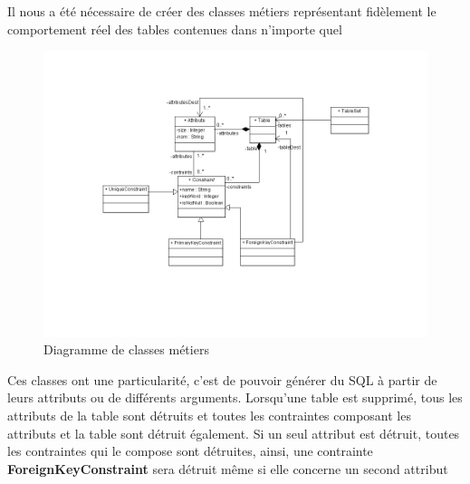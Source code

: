 Il nous a été nécessaire de créer des classes métiers représentant fidèlement le comportement réel des tables contenues dans n'importe quel \sgbd

\begin{figure}[!h]
\centering
\includegraphics[width=13cm]{images/metier.png}
\caption{Diagramme de classes métiers}
\label{classes_metiers}
\end{figure}


Ces classes ont une particularité, c'est de pouvoir générer du SQL à partir de leurs attributs ou de différents arguments.
Lorsqu'une table est supprimé, tous les attributs de la table sont détruits et toutes les contraintes composant les attributs et la table sont détruit également.
Si un seul attribut est détruit, toutes les contraintes qui le compose sont détruites, ainsi, une contrainte \textbf{ForeignKeyConstraint} sera détruit même si elle concerne un second attribut
